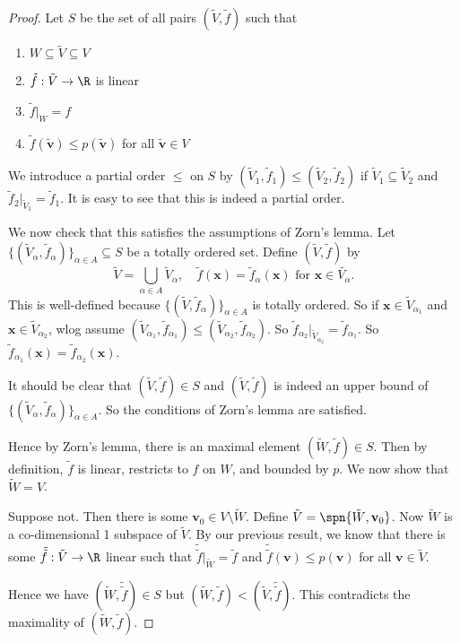 \documentclass[a4paper]{article}
\begin{document}
\begin{proof}
  Let $S$ be the set of all pairs $(\tilde{V}, \tilde{f})$ such that
  \begin{enumerate}
    \item $W\subseteq \tilde{V}\subseteq V$
    \item $\tilde{f}: \tilde{V} \to \R$ is linear
    \item $\tilde{f}|_W = f$
    \item $\tilde{f}(\tilde{\mathbf{v}}) \leq p(\tilde{\mathbf{v}})$ for all $\tilde{\mathbf{v}} \in V$
  \end{enumerate}

  We introduce a partial order $\leq$ on $S$ by $(\tilde{V}_1, \tilde{f}_1) \leq (\tilde{V}_2, \tilde{f}_2)$ if $\tilde{V}_1 \subseteq \tilde{V}_2$ and $\tilde{f}_2 |_{\tilde{V}_1} = \tilde{f}_1$. It is easy to see that this is indeed a partial order.

  We now check that this satisfies the assumptions of Zorn's lemma. Let $\{(\tilde{V}_\alpha, \tilde{f}_\alpha)\}_{\alpha\in A} \subseteq S$ be a totally ordered set. Define $(\tilde{V}, \tilde{f})$ by
  \[
    \tilde{V} = \bigcup_{\alpha\in A} \tilde{V}_\alpha,\quad \tilde{f}(\mathbf{x}) = \tilde{f}_\alpha(\mathbf{x})\text{ for }\mathbf{x}\in \tilde{V_\alpha}.
  \]
  This is well-defined because $\{(\tilde{V}, \tilde{f}_\alpha)\}_{\alpha\in A}$ is totally ordered. So if $\mathbf{x}\in \tilde{V}_{\alpha_1}$ and $\mathbf{x} \in \tilde{V}_{\alpha_2}$, wlog assume $(\tilde{V}_{\alpha_1}, \tilde{f}_{\alpha_1}) \leq (\tilde{V}_{\alpha_2}, \tilde{f}_{\alpha_2})$. So $\tilde{f}_{\alpha_2}|_{\tilde{V}_{\alpha_2}} = \tilde{f}_{\alpha_1}$. So $\tilde{f}_{\alpha_1}(\mathbf{x}) = \tilde{f}_{\alpha_2}(\mathbf{x})$.

  It should be clear that $(\tilde{V}, \tilde{f})\in S$ and $(\tilde{V}, \tilde{f})$ is indeed an upper bound of $\{(\tilde{V}_\alpha, \tilde{f}_\alpha)\}_{\alpha\in A}$. So the conditions of Zorn's lemma are satisfied.

  Hence by Zorn's lemma, there is an maximal element $(\tilde{W}, \tilde{f}) \in S$. Then by definition, $\tilde{f}$ is linear, restricts to $f$ on $W$, and bounded by $p$. We now show that $\tilde{W} = V$.

  Suppose not. Then there is some $\mathbf{v}_0 \in V\setminus \tilde{W}$. Define $\tilde{V} = \spn\{\tilde{W}, \mathbf{v}_0\}$. Now $\tilde{W}$ is a co-dimensional 1 subspace of $\tilde{V}$. By our previous result, we know that there is some $\tilde{\tilde{f}}: \tilde{V} \to \R$ linear such that $\tilde{\tilde{f}}|_{\tilde{W}} = \tilde{f}$ and $\tilde{\tilde{f}}(\mathbf{v}) \leq p(\mathbf{v})$ for all $\mathbf{v}\in \tilde{V}$.

  Hence we have $(\tilde{W}, \tilde{\tilde{f}}) \in S$ but $(\tilde{W}, \tilde{f}) < (\tilde{V}, \tilde{\tilde{f}})$. This contradicts the maximality of $(\tilde{W}, \tilde{f})$.
\end{proof}
\end{document}
